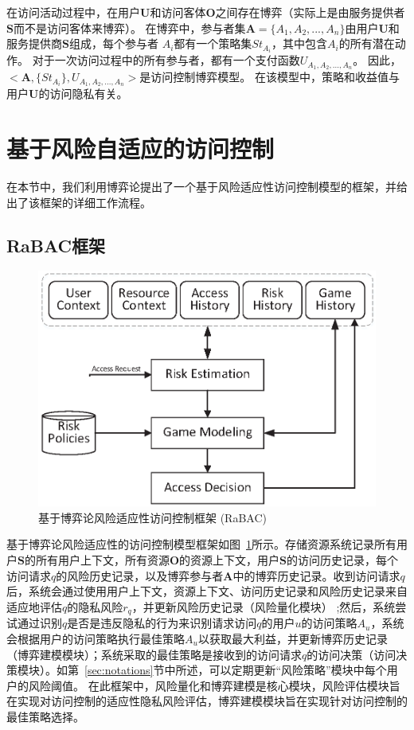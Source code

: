 在访问活动过程中，在用户$\mathbf{U}$和访问客体$\mathbf{O}$之间存在博弈（实际上是由服务提供者$\mathbf{S}$而不是访问客体来博弈）。 在博弈中，参与者集$\mathbf{A}=\{A_1,A_2,...,A_n\}$由用户$\mathbf{U}$和服务提供商$\mathbf{S}$组成，每个参与者 $A_i$都有一个策略集$St_{A_i}$，其中包含$A_i$的所有潜在动作。 对于一次访问过程中的所有参与者，都有一个支付函数$U_{A_1,A_2,...,A_n}$。 因此，$<\mathbf{A},\{St_{A_i}\},U_{A_1,A_2,...,A_n}>$是访问控制博弈模型。 在该模型中，策略和收益值与用户$\mathbf{U}$的访问隐私有关。

\section{基于风险自适应的访问控制}
\label{sec:framework}


在本节中，我们利用博弈论提出了一个基于风险适应性访问控制模型的框架，并给出了该框架的详细工作流程。
\subsection{RaBAC框架}
\label{sec:hlframework}

\begin{figure}[htb]
	\centering
	\includegraphics[width=.85\textwidth]{./figures/game-rbac-framework.eps}
	\caption{基于博弈论风险适应性访问控制框架 (RaBAC)}\label{fig:game-rbac-framework}
\end{figure}



基于博弈论风险适应性的访问控制模型框架如图~\ref{fig:game-rbac-framework}所示。存储资源系统记录所有用户$\mathbf{S}$的所有用户上下文，所有资源$\mathbf{O}$的资源上下文，用户$\mathbf{S}$的访问历史记录，每个访问请求$q$的风险历史记录，以及博弈参与者$\mathbf{A}$中的博弈历史记录。收到访问请求$q$后，系统会通过使用用户上下文，资源上下文、访问历史记录和风险历史记录来自适应地评估$q$的隐私风险$r_q$，并更新风险历史记录（风险量化模块） ;然后，系统尝试通过识别$q$是否是违反隐私的行为来识别请求访问$q$的用户$u$的访问策略$A_u$，系统会根据用户的访问策略执行最佳策略$A_u$以获取最大利益，并更新博弈历史记录（博弈建模模块）；系统采取的最佳策略是接收到的访问请求$q$的访问决策（访问决策模块）。如第~\ref{sec:notations}节中所述，可以定期更新“风险策略”模块中每个用户的风险阈值。
在此框架中，风险量化和博弈建模是核心模块，风险评估模块旨在实现对访问控制的适应性隐私风险评估，博弈建模模块旨在实现针对访问控制的最佳策略选择。


